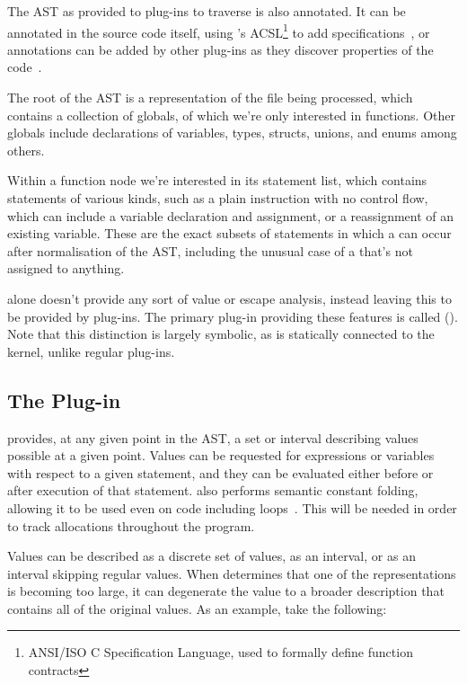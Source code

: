 The AST as provided to plug-ins to traverse is also annotated. It can be annotated in the source code itself, using 's ACSL\footnote{ANSI/ISO C Specification Language, used to formally define function contracts} to add specifications~\cite{framaacsl}, or annotations can be added by other plug-ins as they discover properties of the code~\cite{framaplug}.

The root of the AST is a representation of the file being processed, which contains a collection of globals, of which we're only interested in functions. Other globals include declarations of variables, types, structs, unions, and enums among others.

Within a function node we're interested in its statement list, which contains statements of various kinds, such as a plain instruction with no control flow, which can include a variable declaration and assignment, or a reassignment of an existing variable. These are the exact subsets of statements in which a \malloc{} can occur after normalisation of the AST, including the unusual case of a \malloc{} that's not assigned to anything.

 alone doesn't provide any sort of value or escape analysis, instead leaving this to be provided by plug-ins. The primary plug-in providing these features is called  (). Note that this distinction is largely symbolic, as  is statically connected to the  kernel, unlike regular plug-ins.

\subsection{The  Plug-in} \label{EVA}

 provides, at any given point in the AST, a set or interval describing values possible at a given point. Values can be requested for expressions or variables with respect to a given statement, and they can be evaluated either before or after execution of that statement.  also performs semantic constant folding, allowing it to be used even on code including loops~\cite{framaeva}. This will be needed in order to track allocations throughout the program.

Values can be described as a discrete set of values, as an interval, or as an interval skipping regular values. When  determines that one of the representations is becoming too large, it can degenerate the value to a broader description that contains all of the original values. As an example, take the following:


